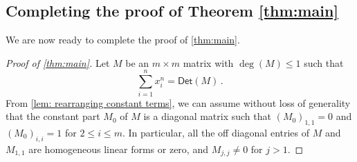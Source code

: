 \documentclass[10pt,a4paper]{article}
\newcommand{\Det}{\mathsf{Det}}
\begin{document}
\subsection{Completing the proof of Theorem \ref{thm:main}}\label{sec:completing the proof}
We are now ready to complete the proof of \autoref{thm:main}. 
\begin{proof}[Proof of \autoref{thm:main}]
Let $M$ be an $m \times m$ matrix with $\deg(M) \leq 1$ such that 
\[
\sum_{i = 1}^n x_i^n = \Det(M) \, .
\]
From \autoref{lem: rearranging constant terms}, we can assume without loss of generality that the constant part $M_0$ of $M$ is a diagonal matrix such that $(M_0)_{1,1} = 0$ and $(M_0)_{i,i}=1$ for $2 \le i \le m$. In particular, all the off diagonal entries of $M$ and $M_{1,1}$ are homogeneous linear forms or zero, and $M_{j, j} \neq 0$ for $j > 1$. 


\end{proof}
\end{document}
